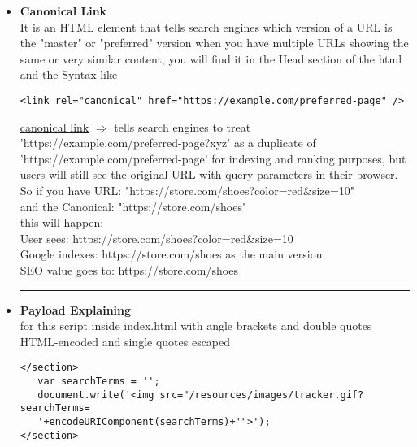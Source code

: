 \documentclass{article}
\begin{document}
\begin{itemize}
	\item \textbf{Canonical Link} 
	\\It is an HTML element that tells search engines which version of a URL is the "master" or "preferred" version when you have multiple URLs showing the same or very similar content, you will find it in the Head section of the html and the Syntax like
	        \begin{lstlisting}[frame=single]
   <link rel="canonical" href="https://example.com/preferred-page" />
            \end{lstlisting}        
\underline{canonical link} $\Longrightarrow$ tells search engines to treat 'https://example.com/preferred-page?xyz' as a duplicate of 'https://example.com/preferred-page' for indexing and ranking purposes, but users will still see the original URL with query parameters in their browser.
\\So if you have URL: "https://store.com/shoes?color=red\&size=10" 
\\and the Canonical: "https://store.com/shoes"
\\this will happen:
  \\User sees: https://store.com/shoes?color=red\&size=10
  \\Google indexes: https://store.com/shoes as the main version
  \\SEO value goes to: https://store.com/shoes
  \\ \rule{5cm}{0.4pt}
  \item \textbf{Payload Explaining} 
  \\for this script inside index.html with angle brackets and double quotes HTML-encoded and single quotes escaped
  	        \begin{lstlisting}[frame=single]
</section>
   var searchTerms = '';
   document.write('<img src="/resources/images/tracker.gif?searchTerms=
   '+encodeURIComponent(searchTerms)+'">');
</section>
            \end{lstlisting}
            

\end{itemize}
\end{document}
